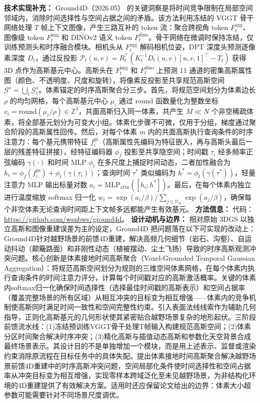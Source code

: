 \textbf{技术实现补充：} Ground4D（2026.05） 的关键洞察是将时间竞争限制在局部空间邻域内，消除时间选择性与空间占据之间的矛盾。该方法利用冻结的 VGGT 骨干网络处理 $T$ 帧上下文图像，产生三路互补的 token 流：聚合跨视角 token $F_t^{\mathrm{agg}}$、图像级 token $F_t^{\mathrm{img}}$ 和 DINOv2 语义 token $F_t^{\mathrm{dino}}$。骨干网络在微调时保持冻结，仅训练预测头和时序融合模块。相机头从 $F_t^{\mathrm{agg}}$ 解码相机位姿，DPT 深度头预测逐像素深度 $D_t$，通过反投影 $\mathcal{P}_t(u,v) = R_t^\top(K_t^{-1}D_t(u,v)[u,v,1]^\top - T_t)$ 获得 3D 点作为高斯基元中心。高斯头在 $F_t^{\mathrm{img}}$ 和 $F_t^{\mathrm{dino}}$ 上预测 11 通道的密集高斯属性图（颜色、不透明度、尺度和旋转），将像素反投影至共享规范高斯空间 $\mathcal{G}^s = \bigcup_t \mathcal{G}_t^s$。体素锚定的时序高斯聚合分三步。首先，将规范空间划分为体素边长 $\rho$ 的均匀网格，每个高斯基元中心 $\mu_i$ 通过 round 函数量化为整数坐标 $v_i = \mathrm{round}(\mu_i / \rho) \in \mathbb{Z}^3$，共面高斯归入同一体素，共产生 $M \ll N$ 个非空稀疏体素，将全部基元划分为可变大小组。体素化步骤不可微，仅用于分组，梯度通过聚合阶段的高斯属性回传。然后，对每个体素 $m$ 内的共面高斯执行查询条件的时序注意力：每个基元携带特征 $f_i^{\mathrm{gs}}$（高斯属性先编码为特征嵌入，再与高斯头最后一层的残差特征拼接），经特征编码器 $\phi_f$ 投影至共享隐空间；时间戳 $\tau_i$ 经多频率正弦编码 $\gamma(\cdot)$ 和时间 MLP $\phi_t$ 在多尺度上捕捉时间动态，二者加性融合为 $h_i = \phi_f(f_i^{\mathrm{gs}}) + \phi_t(\gamma(\tau_i))$；查询时间 $\tau^*$ 类似编码为 $h^* = \phi_t(\gamma(\tau^*))$，轻量注意力 MLP 输出标量对数 $a_i = \mathrm{MLP}_{\mathrm{attn}}([h_i; h^*])$。最后，在每个体素内独立进行温度缩放 softmax 归一化 $w_i = \exp(a_i/\beta) / \sum_{j \in \mathcal{V}_m}\exp(a_j/\beta)$，确保每个非空体素无论查询时间距上下文帧多远都能产生有效基元。
\textbf{方法信息：} 代码：\url{https://github.com/wsnbws/ground4d}。
\textbf{设计动机与边界：} 相对原始 3DGS 以独立高斯和图像重建误差为主的设定，Ground4D 把问题落在以下可实现的改动上：Ground4D针对越野场景的前馈4D重建，解决高频几何细节（岩石、沟壑）、自运动抖动（颠簸路面）和非刚性动态（植被摆动、尘土飞扬）导致的时序高斯观测冲突问题。核心创新是体素接地时间高斯聚合（Voxel-Grounded Temporal Gaussian Aggregation）：将规范高斯空间划分为规则的三维空间体素网格，在每个体素内执行查询条件的时间注意力评分，计算每个时间戳对应的高斯激活概率。关键的体素内softmax归一化确保时间选择性（选择最佳时间戳的高斯表示）和空间占据率（覆盖完整场景的所有区域）从相互冲突的目标变为相互增强——体素内的竞争机制使高斯同时满足时间一致性和空间完整性约束。引入表面法线线索作为辅助几何指导，正则化高斯基元的几何形状使其紧密贴合越野场景复杂的地形起伏。三阶段前馈流水线：(1)冻结预训练VGGT骨干处理T帧输入构建规范高斯空间；(2)体素分区时间聚合解决时序冲突；(3)精化高斯与插值动态高斯和参数化天空背景合成最终场景表示。其设计目的不是单独增加一个模块，而是用上述表示、监督或渲染约束消除原流程在目标任务中的具体失配。提出体素接地时间高斯聚合解决越野场景前馈4D重建中的时序高斯冲突问题，空间局部化条件使时间选择性和空间占据率从冲突目标变为相互增强，实现零样本跨域泛化至未见越野场景，为非结构化环境的4D重建提供了有效解决方案。适用时还应保留论文给出的边界：体素大小超参数可能需要针对不同场景尺度调优。

